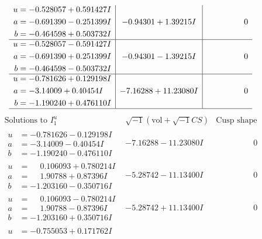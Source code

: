 \documentclass[1p]{elsarticle_modified}
\theoremstyle{definition}
\newcommand{\I}{\sqrt{-1}}
\begin{document}
$$\begin{array}{c|c|c}
\begin{aligned}
u &= -0.528057 + 0.591427 I \\
a &= -0.691390 - 0.251399 I \\
b &= -0.464598 + 0.503732 I\end{aligned}
 & -0.94301 + 1.39215 I & \phantom{-0.000000 } 0 \\ \hline\begin{aligned}
u &= -0.528057 - 0.591427 I \\
a &= -0.691390 + 0.251399 I \\
b &= -0.464598 - 0.503732 I\end{aligned}
 & -0.94301 - 1.39215 I & \phantom{-0.000000 } 0 \\ \hline\begin{aligned}
u &= -0.781626 + 0.129198 I \\
a &= -3.14009 + 0.40454 I \\
b &= -1.190240 + 0.476110 I\end{aligned}
 & -7.16288 + 11.23080 I & \phantom{-0.000000 } 0\\
 \hline 
 \end{array}$$\newpage$$\begin{array}{c|c|c}  
\text{Solutions to }I^u_{1}& \I (\text{vol} + \sqrt{-1}CS) & \text{Cusp shape}\\
 \hline 
\begin{aligned}
u &= -0.781626 - 0.129198 I \\
a &= -3.14009 - 0.40454 I \\
b &= -1.190240 - 0.476110 I\end{aligned}
 & -7.16288 - 11.23080 I & \phantom{-0.000000 } 0 \\ \hline\begin{aligned}
u &= \phantom{-}0.106093 + 0.780214 I \\
a &= \phantom{-}1.90788 + 0.87396 I \\
b &= -1.203160 - 0.350716 I\end{aligned}
 & -5.28742 - 11.13400 I & \phantom{-0.000000 } 0 \\ \hline\begin{aligned}
u &= \phantom{-}0.106093 - 0.780214 I \\
a &= \phantom{-}1.90788 - 0.87396 I \\
b &= -1.203160 + 0.350716 I\end{aligned}
 & -5.28742 + 11.13400 I & \phantom{-0.000000 } 0 \\ \hline\begin{aligned}
u &= -0.755053 + 0.171762 I \\

\end{aligned}
\end{array}$$
\end{document}
